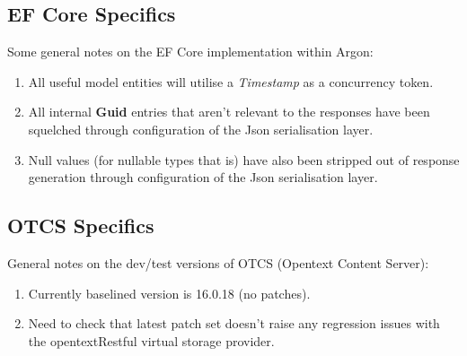 \documentclass{book}
\begin{document}
\subsection{EF Core Specifics}
Some general notes on the EF Core implementation within Argon:
\begin{enumerate}
    \item All useful model entities will utilise a \textit{Timestamp} as a concurrency token. 
    \item All internal \textbf{Guid} entries that aren't relevant to the responses have been squelched through configuration of the Json serialisation layer.
    \item Null values (for nullable types that is) have also been stripped out of response generation through configuration of the Json serialisation layer.
\end{enumerate}
\subsection{OTCS Specifics}
General notes on the dev/test versions of OTCS (Opentext Content Server):
\begin{enumerate}
    \item Currently baselined version is 16.0.18 (no patches).
    \item Need to check that latest patch set doesn't raise any regression issues with the opentextRestful virtual storage provider.
\end{enumerate}
\end{document}
